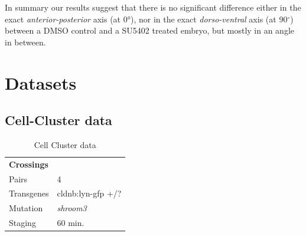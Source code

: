 \documentclass[11pt,singlespacinge,twoside]{reedthesis} %
\begin{document}
In summary our results suggest that there is no significant difference either in the exact \emph{anterior-posterior} axis (at 0°), nor in the exact \emph{dorso-ventral} axis (at 90\(^\circ\)) between a DMSO control and a SU5402 treated embryo, but mostly in an angle in between.

\hypertarget{mat-datasets}{%
\section{Datasets}\label{mat-datasets}}

\hypertarget{cc-data}{%
\subsection{Cell-Cluster data}\label{cc-data}}
\begin{longtable}[]{@{}ll@{}}
\caption{\label{tab:ccdata} Cell Cluster data}\tabularnewline
\toprule
\endhead
\begin{minipage}[t]{0.21\columnwidth}\raggedright
\textbf{Crossings}\strut
\end{minipage} & \begin{minipage}[t]{0.73\columnwidth}\raggedright
\strut
\end{minipage}\tabularnewline
\begin{minipage}[t]{0.21\columnwidth}\raggedright
Pairs\strut
\end{minipage} & \begin{minipage}[t]{0.73\columnwidth}\raggedright
4\strut
\end{minipage}\tabularnewline
\begin{minipage}[t]{0.21\columnwidth}\raggedright
Transgenes\strut
\end{minipage} & \begin{minipage}[t]{0.73\columnwidth}\raggedright
cldnb:lyn-gfp +/?\strut
\end{minipage}\tabularnewline
\begin{minipage}[t]{0.21\columnwidth}\raggedright
Mutation\strut
\end{minipage} & \begin{minipage}[t]{0.73\columnwidth}\raggedright
\emph{shroom3}\strut
\end{minipage}\tabularnewline
\begin{minipage}[t]{0.21\columnwidth}\raggedright
Staging\strut
\end{minipage} & \begin{minipage}[t]{0.73\columnwidth}\raggedright
60 min.\strut
\end{minipage}\tabularnewline

\end{longtable}
\end{document}
